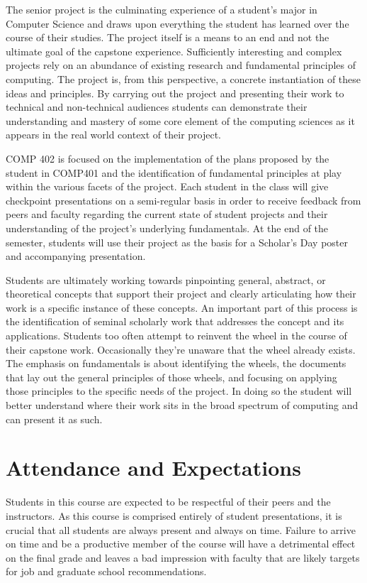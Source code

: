 \documentclass[10pt]{article}
\begin{document}
The senior project is the culminating experience of a student's major in Computer Science and draws upon everything the student has learned over the course of their studies. The project itself is a means to an end and not the ultimate goal of the capstone experience. Sufficiently interesting and complex projects rely on an abundance of existing research and fundamental principles of computing.  The project is, from this perspective, a concrete instantiation of these ideas and principles. By carrying out the project and presenting their work to technical and non-technical audiences students can demonstrate their understanding and mastery of some core element of the computing sciences as it appears in the real world context of their project. 

COMP 402 is focused on the implementation of the plans proposed by the student in COMP401 and the identification of fundamental principles at play within the various facets of the project. Each student in the class will give checkpoint presentations on a semi-regular basis in order to receive feedback from peers and faculty regarding the current state of student projects and their understanding of the project's underlying fundamentals.   At the end of the semester, students will use their project as the basis for a Scholar's Day poster and accompanying presentation.

Students are ultimately working towards pinpointing general, abstract, or theoretical concepts that support their project and clearly articulating how their work is a specific instance of these concepts. An important part of this process is the identification of seminal scholarly work that addresses the concept and its applications. Students too often attempt to reinvent the wheel in the course of their capstone work. Occasionally they're unaware that the wheel already exists. The emphasis on fundamentals is about identifying the wheels, the documents that lay out the general principles of those wheels, and focusing on applying those principles to the specific needs of the project. In doing so the student will better understand where their work sits in the broad spectrum of computing and can present it as such. 


\section{Attendance and Expectations}

Students in this course are expected to be respectful of their peers and the instructors. As this course is comprised entirely of student presentations, it is crucial that all students are always present and always on time.  Failure to arrive on time and be a productive member of the course will have a detrimental effect on the final grade and leaves a bad impression with faculty that are likely targets for job and graduate school recommendations.
\end{document}
